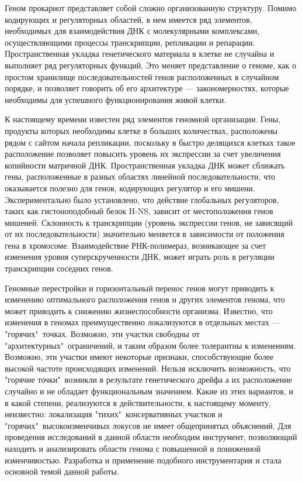 
{\actuality} Геном прокариот представляет собой сложно организованную структуру. Помимо кодирующих и регуляторных областей, в нем имеется ряд элементов, необходимых для взаимодействия ДНК с молекулярными комплексами, осуществляющими процессы транскрипции, репликации и репарации. Пространственная укладка генетического материала в клетке не случайна и выполняет ряд регуляторных функций. Это меняет представление о геноме, как о простом хранилище последовательностей генов расположенных в случайном порядке, и позволяет говорить об его архитектуре --- закономерностях, которые необходимы для успешного функционирования живой клетки.

К настоящему времени известен ряд элементов геномной организации. Гены, продукты которых необходимы клетке в больших количествах, расположены рядом с сайтом начала репликации, поскольку в быстро делящихся клетках такое расположение позволяет повысить уровень их экспрессии за счет увеличения копийности матричной ДНК. Пространственная укладка ДНК может сближать гены, расположенные в разных областях линейной последовательности, что оказывается полезно для генов, кодирующих регулятор и его мишени. Экспериментально было установлено, что действие глобальных регуляторов, таких как гистоноподобный белок H-NS, зависит от местоположения генов мишеней. Склонность к транскрипции (уровень экспрессии генов, не зависящий от их последовательности) значительно меняется в зависимости от положения гена в хромосоме. Взаимодействие РНК-полимераз, возникающее за счет изменения уровня суперскрученности ДНК, может играть роль в регуляции транскрипции соседних генов.

Геномные перестройки и горизонтальный перенос генов могут приводить к изменению оптимального расположения генов и других элементов генома, что может приводить к снижению жизнеспособности организма. Известно, что изменения в геномах преимущественно локализуются в отдельных местах --- "горячих"\ точках. Возможно, эти участки свободны от "архитектурных"\ ограничений, и таким образом более толерантны к изменениям. Возможно, эти участки имеют некоторые признаки, способствующие более высокой частоте происходящих изменений. Нельзя исключить возможность, что "горячие точки"\ возникли в результате генетического дрейфа а их расположение случайно и не обладает функциональным значением. Какие из этих вариантов, и в какой степени, реализуются в действительности, к настоящему моменту, неизвестно: локализация "тихих"\ консервативных участков и "горячих"\ высокоизменчивых локусов не имеет общепринятых объяснений. Для проведения исследований в данной области необходим инструмент, позволяющий находить и анализировать области генома с повышенной и пониженной изменчивостью. Разработка и применение подобного инструментария и стала основной темой данной работы. 

